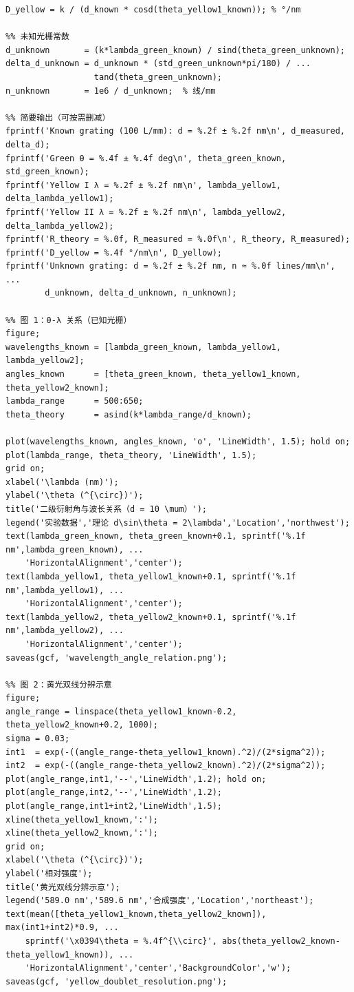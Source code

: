 ﻿\documentclass[12pt,a4paper]{article}
\begin{document}
\begin{lstlisting}[style=Matlab-boxed,caption={光栅实验数据处理代码}]
D_yellow = k / (d_known * cosd(theta_yellow1_known)); % °/nm

%% 未知光栅常数
d_unknown       = (k*lambda_green_known) / sind(theta_green_unknown);
delta_d_unknown = d_unknown * (std_green_unknown*pi/180) / ...
                  tand(theta_green_unknown);
n_unknown       = 1e6 / d_unknown;  % 线/mm

%% 简要输出（可按需删减）
fprintf('Known grating (100 L/mm): d = %.2f ± %.2f nm\n', d_measured, delta_d);
fprintf('Green θ = %.4f ± %.4f deg\n', theta_green_known, std_green_known);
fprintf('Yellow I λ = %.2f ± %.2f nm\n', lambda_yellow1, delta_lambda_yellow1);
fprintf('Yellow II λ = %.2f ± %.2f nm\n', lambda_yellow2, delta_lambda_yellow2);
fprintf('R_theory = %.0f, R_measured = %.0f\n', R_theory, R_measured);
fprintf('D_yellow = %.4f °/nm\n', D_yellow);
fprintf('Unknown grating: d = %.2f ± %.2f nm, n ≈ %.0f lines/mm\n', ...
        d_unknown, delta_d_unknown, n_unknown);

%% 图 1：θ-λ 关系（已知光栅）
figure;
wavelengths_known = [lambda_green_known, lambda_yellow1, lambda_yellow2];
angles_known      = [theta_green_known, theta_yellow1_known, theta_yellow2_known];
lambda_range      = 500:650;
theta_theory      = asind(k*lambda_range/d_known);

plot(wavelengths_known, angles_known, 'o', 'LineWidth', 1.5); hold on;
plot(lambda_range, theta_theory, 'LineWidth', 1.5);
grid on;
xlabel('\lambda (nm)');
ylabel('\theta (^{\circ})');
title('二级衍射角与波长关系（d = 10 \mum）');
legend('实验数据','理论 d\sin\theta = 2\lambda','Location','northwest');
text(lambda_green_known, theta_green_known+0.1, sprintf('%.1f nm',lambda_green_known), ...
    'HorizontalAlignment','center');
text(lambda_yellow1, theta_yellow1_known+0.1, sprintf('%.1f nm',lambda_yellow1), ...
    'HorizontalAlignment','center');
text(lambda_yellow2, theta_yellow2_known+0.1, sprintf('%.1f nm',lambda_yellow2), ...
    'HorizontalAlignment','center');
saveas(gcf, 'wavelength_angle_relation.png');

%% 图 2：黄光双线分辨示意
figure;
angle_range = linspace(theta_yellow1_known-0.2, theta_yellow2_known+0.2, 1000);
sigma = 0.03;
int1  = exp(-((angle_range-theta_yellow1_known).^2)/(2*sigma^2));
int2  = exp(-((angle_range-theta_yellow2_known).^2)/(2*sigma^2));
plot(angle_range,int1,'--','LineWidth',1.2); hold on;
plot(angle_range,int2,'--','LineWidth',1.2);
plot(angle_range,int1+int2,'LineWidth',1.5);
xline(theta_yellow1_known,':');
xline(theta_yellow2_known,':');
grid on;
xlabel('\theta (^{\circ})');
ylabel('相对强度');
title('黄光双线分辨示意');
legend('589.0 nm','589.6 nm','合成强度','Location','northeast');
text(mean([theta_yellow1_known,theta_yellow2_known]), max(int1+int2)*0.9, ...
    sprintf('\x0394\theta = %.4f^{\\circ}', abs(theta_yellow2_known-theta_yellow1_known)), ...
    'HorizontalAlignment','center','BackgroundColor','w');
saveas(gcf, 'yellow_doublet_resolution.png');


\end{lstlisting}
\end{document}
